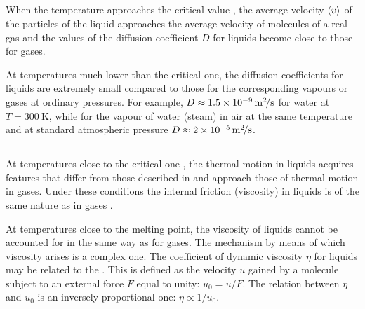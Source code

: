 \subsection{}\label{13.3.3} When the temperature approaches the critical value , the average velocity $\expval{v}$ of the particles of the liquid approaches the average velocity of molecules of a real gas and the values of the diffusion coefficient $D$ for liquids become close to those for gases.

At temperatures much lower than the critical one, the diffusion coefficients for liquids are extremely small compared to those for the corresponding vapours or gases at ordinary pressures. For example, $D \approx \SI{1.5d-9}{\meter\squared\per\second}$ for water at $T = \SI{300}{\kelvin}$, while for the vapour of water (steam) in air at the same temperature and at standard atmospheric pressure $D \approx \SI{2d-5}{\meter\squared\per\second}$. 

\subsection{}\label{13.3.4} At temperatures close to the critical one , the thermal motion in liquids acquires features that differ from those described in  and approach those of thermal motion in gases. Under these conditions the internal friction (viscosity) in liquids is of the same nature as in gases .

At temperatures close to the melting point, the viscosity of liquids cannot be accounted for in the same way as for gases. The mechanism by means of which viscosity arises is a complex one. The coefficient of dynamic viscosity $\eta$  for liquids may be related to the . This is defined as the velocity $u$ gained by a molecule subject to an external force $F$ equal to unity: $u_{0} = u/F$. The relation between $\eta$ and $u_{0}$ is an inversely proportional one: $\eta \propto 1/u_{0}$. 

